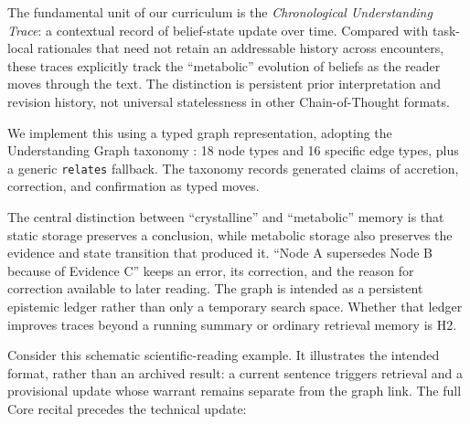 \documentclass[11pt]{article}
\begin{document}
The fundamental unit of our curriculum is the \emph{Chronological Understanding Trace}: a contextual record of belief-state update over time. Compared with task-local rationales that need not retain an addressable history across encounters, these traces explicitly track the ``metabolic'' evolution of beliefs as the reader moves through the text. The distinction is persistent prior interpretation and revision history, not universal statelessness in other Chain-of-Thought formats.

We implement this using a typed graph representation, adopting the Understanding
Graph taxonomy \cite{westerberg2026understanding}: 18 node types and 16 specific
edge types, plus a generic \texttt{relates} fallback. The taxonomy records
generated claims of accretion, correction, and confirmation as typed moves.

The central distinction between ``crystalline'' and ``metabolic'' memory is
that static storage preserves a conclusion, while metabolic storage also
preserves the evidence and state transition that produced it. ``Node A
supersedes Node B because of Evidence C'' keeps an error, its correction, and
the reason for correction available to later reading. The graph is intended as
a persistent epistemic ledger rather than only a temporary search space.
Whether that ledger improves traces beyond a running summary or ordinary
retrieval memory is H2.

Consider this schematic scientific-reading example. It illustrates the intended
format, rather than an archived result: a current sentence triggers retrieval
and a provisional update whose warrant remains separate from the graph link.
The full Core recital precedes the technical update:
\end{document}
